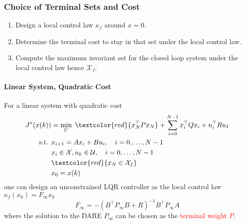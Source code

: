 \subsubsection{Choice of Terminal Sets and Cost}

\begin{enumerate}
    \item Design a local control law $\kappa_f$ around $x=0$.
    \item Determine the terminal cost to stay in that set under the local control law.
    \item Compute the maximum invariant set for the closed loop system under the local control law hence $\mathcal{X}_f$.
\end{enumerate}

\paragraph{Linear System, Quadratic Cost}
For a linear system with quadratic cost
\begin{align*}
    J^*(x(k))    & = \min_{U} \;\textcolor{red}{x^\top_N P x_N} + \sum_{i=0}^{N-1} x_i^\top Q x_i + u_i^\top R u_I \\
    \text{s.t. } & x_{i+1} = Ax_i + Bu_i, \quad i = 0, \ldots, N-1                                                 \\
                 & x_i \in \mathcal{X}, u_k \in \mathcal{U}, \quad i = 0, \ldots, N-1                              \\
                 & \textcolor{red}{x_N \in \mathcal{X}_f}                                                          \\
                 & x_0 = x(k)
\end{align*}
one can design an unconstrained LQR controller as the local control law $\kappa_f(x_k)= F_\infty x_k$
\begin{equation*}
    F_\infty = -{\left(B^\top P_\infty B + R\right)}^{-1} B^\top P_\infty A
\end{equation*}
where the solution to the DARE $P_\infty$ can be chosen as the \textcolor{red}{terminal weight $P$}.

